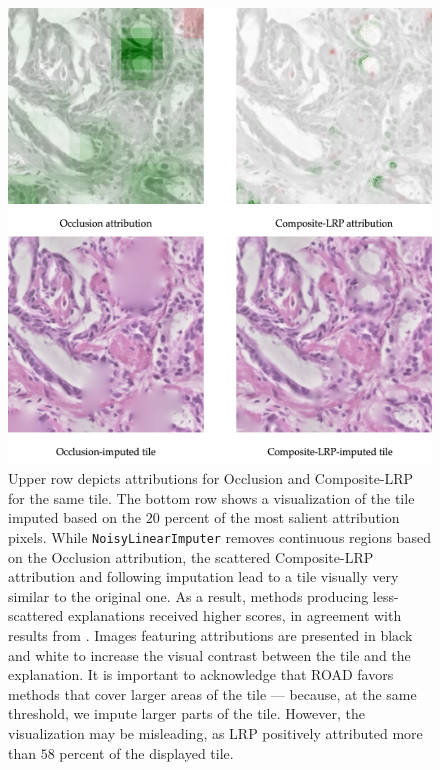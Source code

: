 \begin{figure}
    \begin{center}
    \begin{minipage}{0.8\textwidth}
      \includegraphics[width=\textwidth]{img/road-impute.png}
    \end{minipage}
    \caption{Upper row depicts attributions for Occlusion and Composite-LRP for the same tile. The bottom row shows a visualization of the tile imputed based on the $20$ percent of the most salient attribution pixels. While \texttt{NoisyLinearImputer} removes continuous regions based on the Occlusion attribution, the scattered Composite-LRP attribution and following imputation lead to a tile visually very similar to the original one. As a result, methods producing less-scattered explanations received higher scores, in agreement with results from \cite{gallo}. Images featuring attributions are presented in black and white to increase the visual contrast between the tile and the explanation. It is important to acknowledge that ROAD favors methods that cover larger areas of the tile --- because, at the same threshold, we impute larger parts of the tile. However, the visualization may be misleading, as LRP positively attributed more than $58$ percent of the displayed tile.}
    \label{fig:road-impute}
    \end{center}
\end{figure}

